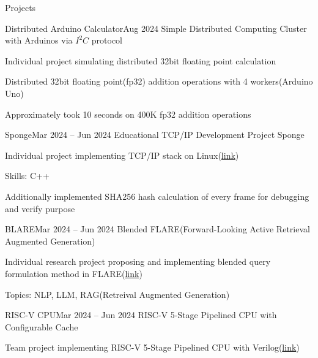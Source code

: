\documentclass{resume}
\begin{document}
\begin{rSection}{Projects}
    \begin{rSubsection}{Distributed Arduino Calculator}{Aug 2024}
        Simple Distributed Computing Cluster with Arduinos via $I^2C$ protocol

        \item Individual project simulating distributed 32bit floating point calculation

        \item Distributed 32bit floating point(fp32) addition operations with 4 workers(Arduino Uno)

        \item Approximately took 10 seconds on 400K fp32 addition operations
    \end{rSubsection}

    \begin{rSubsection}{Sponge}{Mar 2024 -- Jun 2024}
        Educational TCP/IP Development Project Sponge

        \item Individual project implementing TCP/IP stack on Linux(\href{https://github.com/minsusun/csed353-sponge}{link})

        \item Skills: C++

        \item Additionally implemented SHA256 hash calculation of every frame for debugging and verify purpose
    \end{rSubsection}

    \begin{rSubsection}{BLARE}{Mar 2024 -- Jun 2024}
        Blended FLARE(Forward-Looking Active Retrieval Augmented Generation)

        \item Individual research project proposing and implementing blended query formulation method in FLARE(\href{https://github.com/minsusun/BLARE}{link})

        \item Topics: NLP, LLM, RAG(Retreival Augmented Generation)
    \end{rSubsection}

    \begin{rSubsection}{RISC-V CPU}{Mar 2024 -- Jun 2024}
        RISC-V 5-Stage Pipelined CPU with Configurable Cache

        \item Team project implementing RISC-V 5-Stage Pipelined CPU with Verilog(\href{https://github.com/minsusun/csed311}{link})


\end{rSubsection}
\end{rSection}
\end{document}
